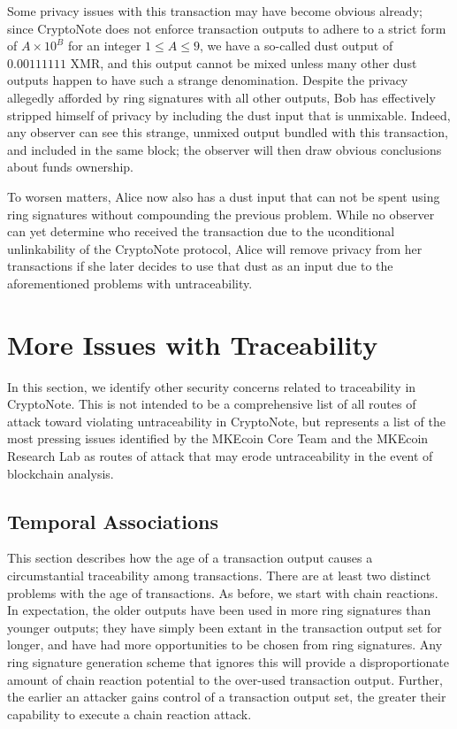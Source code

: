 \documentclass[12pt,english]{mrl}
\theoremstyle{definition}
\renewcommand{\leq}{\leqslant}
\numberwithin{equation}{section}
\numberwithin{figure}{section}
\numberwithin{equation}{section}
\numberwithin{equation}{section}
\numberwithin{figure}{section}
\begin{document}
Some privacy issues with this transaction may have become obvious already; since CryptoNote does not enforce transaction outputs to adhere to a strict form of $A \times 10^{B}$ for an integer $1 \leq A \leq 9$, we have a so-called dust output of $0.00111111$ XMR, and this output cannot be mixed unless many other dust outputs happen to have such a strange denomination. Despite the privacy allegedly afforded by ring signatures with all other outputs, Bob has effectively stripped himself of privacy by including the dust input that is unmixable. Indeed, any observer can see this strange, unmixed output bundled with this transaction, and included in the same block; the observer will then draw obvious conclusions about funds ownership.

To worsen matters, Alice now also has a dust input that can not be spent using ring signatures without compounding the previous problem. While no observer can yet determine who received the transaction due to the uconditional unlinkability of the CryptoNote protocol, Alice will remove privacy from her transactions if she later decides to use that dust as an input due to the aforementioned problems with untraceability.

\section{More Issues with Traceability}\label{moreIssues}
In this section, we identify other security concerns related to traceability in CryptoNote. This is not intended to be a comprehensive list of all routes of attack toward violating untraceability in CryptoNote, but represents a list of the most pressing issues identified by the MKEcoin Core Team and the MKEcoin Research Lab as routes of attack that may erode untraceability in the event of blockchain analysis.

\subsection{Temporal Associations}\label{temporalAssociations}

This section describes how the age of a transaction output causes a circumstantial traceability among transactions. There are at least two distinct problems with the age of transactions. As before, we start with chain reactions. In expectation, the older outputs have been used in more ring signatures than younger outputs; they have simply been extant in the transaction output set for longer, and have had more opportunities to be chosen from ring signatures. Any ring signature generation scheme that ignores this will provide a disproportionate amount of chain reaction potential to the over-used transaction output. Further, the earlier an attacker gains control of a transaction output set, the greater their capability to execute a chain reaction attack.
\end{document}
